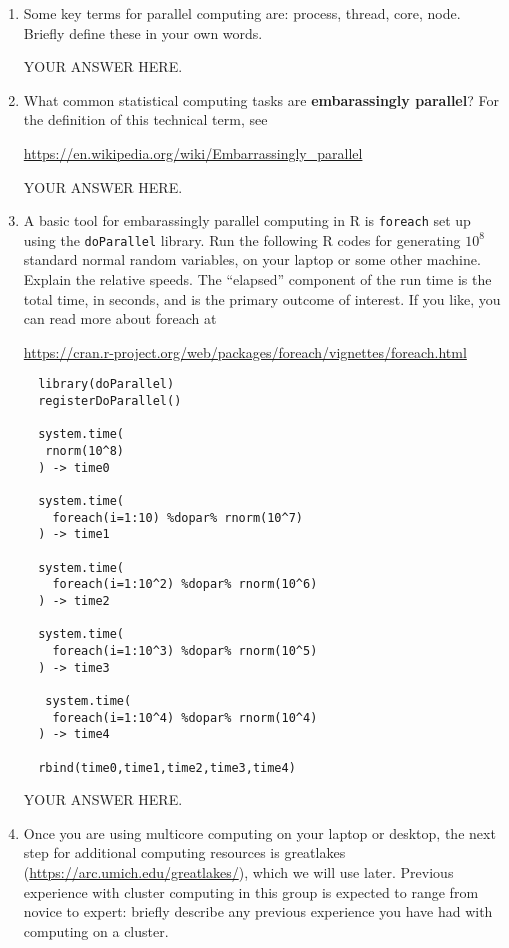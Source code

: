 \documentclass[12pt]{article}
\begin{document}
\begin{enumerate}

\item Some key terms for parallel computing are: process, thread, core, node. Briefly define these in your own words.

YOUR ANSWER HERE.
  
\item What common statistical computing tasks are {\bf embarassingly parallel}? For the definition of this technical term, see

  \url{https://en.wikipedia.org/wiki/Embarrassingly_parallel} 

YOUR ANSWER HERE.

\item A basic tool for embarassingly parallel computing in R is \texttt{foreach} set up using the \texttt{doParallel} library. Run the following R codes for generating $10^8$ standard normal random variables, on your laptop or some other machine. Explain the relative speeds. The ``elapsed'' component of the run time is the total time, in seconds, and is the primary outcome of interest. If you like, you can read more about foreach at
  
\url{https://cran.r-project.org/web/packages/foreach/vignettes/foreach.html}

\begin{verbatim} 
  library(doParallel)
  registerDoParallel()

  system.time(
   rnorm(10^8)
  ) -> time0

  system.time(
    foreach(i=1:10) %dopar% rnorm(10^7)
  ) -> time1

  system.time(
    foreach(i=1:10^2) %dopar% rnorm(10^6)
  ) -> time2

  system.time(
    foreach(i=1:10^3) %dopar% rnorm(10^5)
  ) -> time3

   system.time(
    foreach(i=1:10^4) %dopar% rnorm(10^4)
  ) -> time4
  
  rbind(time0,time1,time2,time3,time4)
\end{verbatim}

  YOUR ANSWER HERE.

\item Once you are using multicore computing on your laptop or desktop, the next step for additional computing resources is greatlakes (\url{https://arc.umich.edu/greatlakes/}), which we will use later. Previous experience with cluster computing in this group is expected to range from novice to expert: briefly describe any previous experience you have had with computing on a cluster.


\end{enumerate}
\end{document}
